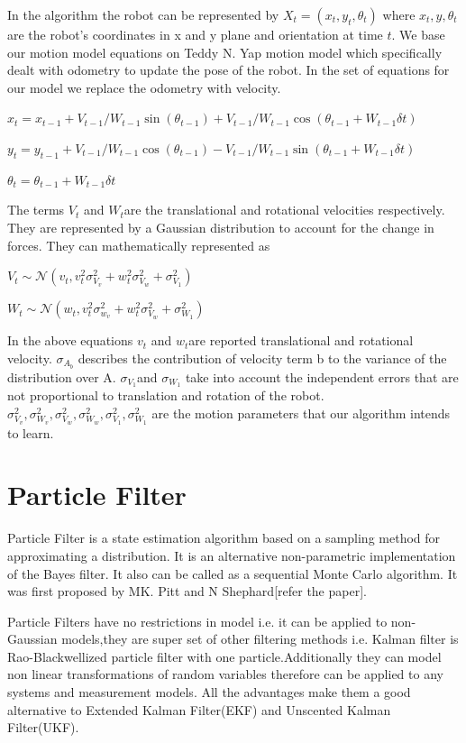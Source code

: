 \documentclass[12pt]{dalcsthesis}
\begin{document}
In the algorithm the robot can be represented by $X_{t}=(x_{t},y_{t},\theta_{t})$
where $x_{t},y,\theta_{t}$ are the robot's coordinates in x and y
plane and orientation at time $t$. We base our motion model equations on Teddy N. Yap motion model which specifically dealt with odometry to update the pose of the robot. In the set of equations for our model we replace the odometry with velocity. 

$x_{t}=x_{t-1}+V_{t-1}/W_{t-1} \sin(\theta_{t-1})+ V_{t-1}/W_{t-1} \cos(\theta_{t-1} + W_{t-1} \delta t)$

$y_{t}=y_{t-1}+V_{t-1}/W_{t-1} \cos(\theta_{t-1})- V_{t-1}/W_{t-1} \sin(\theta_{t-1} + W_{t-1} \delta t)$

$\theta_{t}=\theta_{t-1}+ W_{t-1} \delta t$


The terms $V_{t}$ and $W_{t}$are the translational and rotational
velocities respectively. They are represented by a Gaussian distribution
to account for the change in forces. They can mathematically represented
as 

$V_{t}\sim\mathcal{{N}}(v_{t},v_{t}^{2}\sigma_{V_{v}}^{2}+w_{t}^{2}\sigma_{V_{w}}^{2}+\sigma_{V_{1}}^{2})$

$W_{t}\sim\mathcal{{N}}(w_{t},v_{t}^{2}\sigma_{w_{v}}^{2}+w_{t}^{2}\sigma_{V_{w}}^{2}+\sigma_{W_{1}}^{2})$

In the above equations $v_{t}$ and $w_{t}$are reported translational
and rotational velocity. $\sigma_{A_{b}}$ describes the contribution
of velocity term b to the variance of the distribution over A. $\sigma_{V_{1}}$and
$\sigma_{W_{1}}$ take into account the independent errors that are
not proportional to translation and rotation of the robot. $\sigma_{V_{v}}^{2}\ensuremath{,}\sigma_{W_{v}}^{2}\ensuremath{,}\sigma_{V_{w}}^{2}\ensuremath{,}\sigma_{W_{w}}^{2}\ensuremath{,}\sigma_{V_{1}}^{2}\ensuremath{,}\sigma_{W_{1}}^{2}$
are the motion parameters that our algorithm intends to learn.

\section{Particle Filter}
Particle Filter is a state estimation algorithm based on a sampling method for approximating a distribution. It is an alternative non-parametric implementation of the Bayes filter. It also can be called as a sequential Monte Carlo algorithm. It was first proposed by MK. Pitt and N Shephard[refer the paper]. 

Particle Filters have no restrictions in model i.e. it can be applied to non-Gaussian models,they are super set of other filtering methods i.e. Kalman filter is Rao-Blackwellized particle filter with one particle.Additionally they can model non linear transformations of random variables therefore can be applied to any systems and measurement models. All the advantages make them a good alternative to Extended Kalman Filter(EKF) and Unscented Kalman Filter(UKF). 
\end{document}
